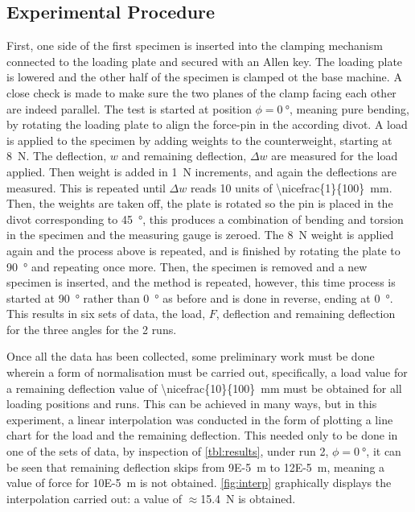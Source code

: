 \documentclass[authoryear]{tex/labreport}
\begin{document}
\subsection{Experimental Procedure}
\label{subsec:procedure}
First, one side of the first specimen is inserted into the clamping mechanism connected to the loading plate and secured with an Allen key. The loading plate is lowered and the other half of the specimen is clamped ot the base machine. A close check is made to make sure the two planes of the clamp facing each other are indeed parallel. The test is started at position $\phi=\SI{0}{\degree}$, meaning pure bending, by rotating the loading plate to align the force-pin in the according divot. A load is applied to the specimen by adding weights to the counterweight, starting at \SI{8}{\newton}. The deflection, $w$ and remaining deflection, $\Delta w$ are measured for the load applied. Then weight is added in \SI{1}{\newton} increments, and again the deflections are measured. This is repeated until $\Delta w$ reads 10 units of \SI[parse-numbers=false]{\nicefrac{1}{100}}{\milli\meter}. Then, the weights are taken off, the plate is rotated so the pin is placed in the divot corresponding to \SI{45}{\degree}, this produces a combination of bending and torsion in the specimen and the measuring gauge is zeroed. The \SI{8}{\newton} weight is applied again and the process above is repeated, and is finished by rotating the plate to \SI{90}{\degree} and repeating once more. Then, the specimen is removed and a new specimen is inserted, and the method is repeated, however, this time process is started at \SI{90}{\degree} rather than \SI{0}{\degree} as before and is done in reverse, ending at \SI{0}{\degree}. This results in six sets of data, the load, $F$, deflection and remaining deflection for the three angles for the 2 runs. 

Once all the data has been collected, some preliminary work must be done wherein a form of normalisation must be carried out, specifically, a load value for a remaining deflection value of \SI[parse-numbers=false]{\nicefrac{10}{100}}{\milli\meter} must be obtained for all loading positions and runs. This can be achieved in many ways, but in this experiment, a linear interpolation was conducted in the form of plotting a line chart for the load and the remaining deflection. This needed only to be done in one of the sets of data, by inspection of \cref{tbl:results}, under run 2, $\phi=\SI{0}{\degree}$, it can be seen that remaining deflection skips from \SI{9E-5}{\meter} to \SI{12E-5}{\meter}, meaning a value of force for \SI{10E-5}{\meter} is not obtained. \cref{fig:interp} graphically displays the interpolation carried out: a value of $\approx$\SI{15.4}{\newton} is obtained. 
\end{document}
